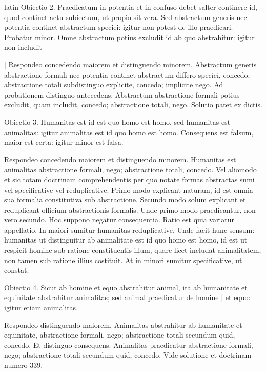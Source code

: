 \begin{otherlanguage*}{latin}
\pstart
  Obiectio 2. Praedicatum in potentia et in confuso debet salter continere id, quod continet actu subiectum, ut propio sit vera. Sed abstractum generis nec potentia continet abstractum speciei: igitur non potest de illo praedicari. Probatur minor. Omne abstractum potius excludit id ab quo abstrahitur: igitur non includit 
\pend

\pstart
  \textnormal{|}   Respondeo concedendo maiorem et distinguendo minorem. Abstractum generis abstractione formali nec potentia continet abstractum differo speciei, concedo; abstractione totali subdistinguo explicite, concedo; implicite nego. Ad probationem distinguo antecedens. Abstractum abstractione formali potius excludit, quam includit, concedo; abstractione totali, nego. Solutio patet ex dictis. 
\pend

\pstart
  Obiectio 3. Humanitas est id est quo homo est homo, sed humanitas est animalitas: igitur animalitas est id quo homo est homo. Consequens est falsum, maior est certa: igitur minor est falsa. 
\pend

\pstart
  Respondeo concedendo maiorem et distinguendo minorem. Humanitas est animalitas abstractione formali, nego; abstractione totali, concedo. Vel aliomodo et sic totam doctrinam comprehendentis per quo notate formas abstractas sumi vel specificative vel reduplicative. Primo modo explicant naturam, id est omnia sua formalia constitutiva sub abstractione. Secundo modo solum explicant et reduplicant officium abstractionis formalis. Unde primo modo praedicantur, non vero secundo. Hoc suppono negatur consequentia. Ratio est quia variatur appellatio. In maiori sumitur humanitas reduplicative. Unde facit hunc sensum: humanitas ut distinguitur ab animalitate est id quo homo est homo, id est ut respicit homine sub ratione constituentis illum, quare licet includat animalitatem, non tamen sub ratione illius costituit. At in minori sumitur specificative, ut constat. 
\pend

\pstart
  Obiectio 4. Sicut ab homine et equo abstrahitur animal, ita ab humanitate et equinitate abstrahitur animalitas; sed animal praedicatur de homine \textnormal{|} et equo: igitur etiam animalitas. 
\pend

\pstart
  Respondeo distinguendo maiorem. Animalitas abstrahitur ab humanitate et equinitate, abstractione formali, nego; abstractione totali secundum quid, concedo. Et distinguo consequens. Animalitas praedicatur abstractione formali, nego; abstractione totali secundum quid, concedo. Vide solutione et doctrinam numero 339. 
\pend


\end{otherlanguage*}
